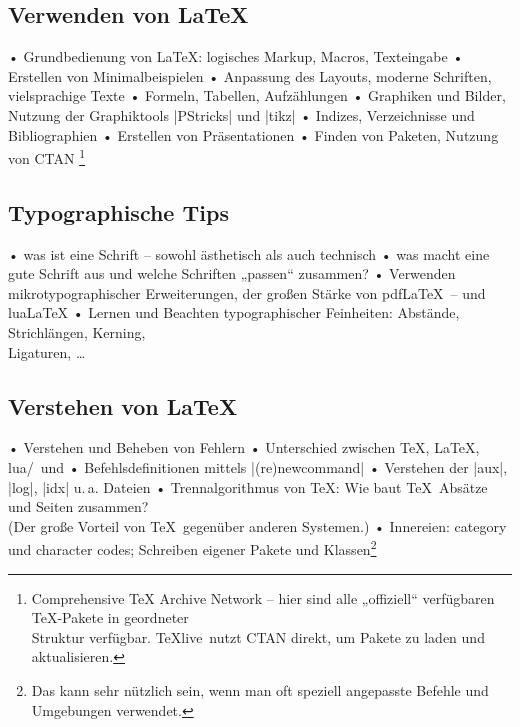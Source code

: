 \documentclass[12pt,ngerman]{scrartcl}
\newcommand{\TeXlive}{\TeX\textsf{live}\xspace}
\begin{document}
\subsection{Verwenden von \LaTeX}
\begin{itemize}
  • Grundbedienung von \LaTeX: logisches Markup, Macros, Texteingabe
  • Erstellen von Minimalbeispielen
  • Anpassung des Layouts, moderne Schriften, vielsprachige Texte
  • Formeln, Tabellen, Aufzählungen
  • Graphiken und Bilder, Nutzung der Graphiktools |PStricks| und |tikz|
  • Indizes, Verzeichnisse und Bibliographien
  • Erstellen von Präsentationen
  • Finden von Paketen, Nutzung von CTAN
\footnote{
  Comprehensive TeX Archive Network – hier sind alle „offiziell“ verfügbaren \TeX-Pakete in geordneter\\ Struktur verfügbar. \TeXlive\ nutzt CTAN direkt, um Pakete zu laden und aktualisieren.}
\end{itemize}

\subsection{Typographische Tips}
\begin{itemize}
  • was ist eine Schrift – sowohl ästhetisch als auch technisch
  • was macht eine gute Schrift aus und welche Schriften „passen“ zusammen?
  • Verwenden mikrotypographischer Erweiterungen, der großen Stärke von pdf\LaTeX\ – und \textsf{lua}\LaTeX
  • Lernen und Beachten typographischer Feinheiten: Abstände, Strichlängen, Kerning,\\ Ligaturen, …
\end{itemize}

\subsection{Verstehen von \LaTeX}
\begin{itemize}
  • Verstehen und Beheben von Fehlern
  • Unterschied zwischen \TeX, \LaTeX, \textsf{lua}/\XeLaTeX\ und \ConTeXt
  • Befehlsdefinitionen mittels |(re)newcommand|
  • Verstehen der |aux|, |log|, |idx| u.\,a. Dateien
  • Trennalgorithmus von \TeX: Wie baut \TeX\ Absätze und Seiten zusammen?\\ (Der große Vorteil von \TeX\ gegenüber anderen Systemen.)
  • Innereien: category und character codes; Schreiben eigener Pakete und Klassen\footnote{Das kann sehr nützlich sein, wenn man oft speziell angepasste Befehle und Umgebungen verwendet.}
\end{itemize}
\end{document}
